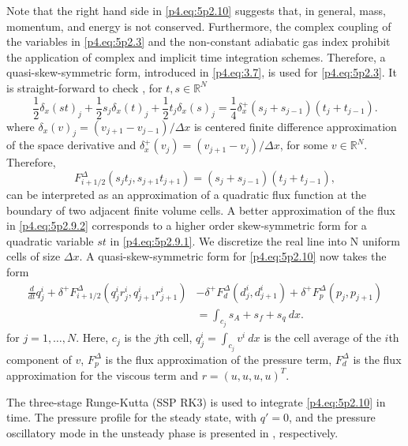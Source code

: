 Note that the right hand side in \eqref{p4.eq:5p2.10} suggests that, in general, mass, momentum, and energy is not conserved. Furthermore, the complex coupling of the variables in \eqref{p4.eq:5p2.3} and the non-constant adiabatic gas index prohibit the application of complex and implicit time integration schemes. Therefore, a quasi-skew-symmetric form, introduced in \eqref{p4.eq:3.7}, is used for \eqref{p4.eq:5p2.3}. It is straight-forward to check \cite{sjogreen2010skew}, for $t,s\in \mathbb R^{N}$
\begin{equation} \label{p4.eq:5p2.9.1}
	\frac 1 2 \delta_x (st)_j + \frac 1 2 s_j \delta_x (t)_j + \frac 1 2 t_j \delta_x (s)_j = \frac 1 4 \delta_x^+( s_j + s_{j-1} )(t_j + t_{j-1}).
\end{equation}
where $\delta_x (v)_j = \left( v_{j+1} - v_{j-1} \right)/\Delta x$ is centered finite difference approximation of the space derivative and $\delta_x^+ (v_j) = \left( v_{j+1} - v_j \right) /\Delta x$, for some $v\in \mathbb R^{N}$. Therefore,
\begin{equation} \label{p4.eq:5p2.9.2}
	F_{i+1/2}^{\Delta}(s_jt_j,s_{j+1}t_{j+1}) = ( s_j + s_{j-1} )(t_j + t_{j-1}),
\end{equation}
can be interpreted as an approximation of a quadratic flux function at the boundary of two adjacent finite volume cells. A better approximation of the flux in \eqref{p4.eq:5p2.9.2} corresponds to a higher order skew-symmetric form for a quadratic variable $st$ in \eqref{p4.eq:5p2.9.1}. We discretize the real line into N uniform cells of size $\Delta x$. A quasi-skew-symmetric form for \eqref{p4.eq:5p2.10} now takes the form
\begin{equation}
\begin{aligned}
	\frac{d}{dt} q^i_j + \delta^+ F^{\Delta}_{i+1/2}(q^i_jr^i_j,q^i_{j+1}r^i_{j+1}) &- \delta^+ F_d^{\Delta}(d^i_j,d^i_{j+1}) + \delta^+ F_p^{\Delta}(p_j,p_{j+1}) \\
	&= \int_{c_j} s_A + s_f + s_q \ dx.
\end{aligned}
\end{equation}
for $j=1,\dots,N$. Here, $c_j$ is the $j$th cell, $q^i_j = \int_{c_j} v^i \ dx$ is the cell average of the $i$th component of $v$, $F^{\Delta}_p$ is the flux approximation of the pressure term, $F^{\Delta}_d$ is the flux approximation for the viscous term and $r = ( u , u , u , u )^T$.

The three-stage Runge-Kutta (SSP RK3) \cite{jiang1996efficient} is used to integrate \eqref{p4.eq:5p2.10} in time. The pressure profile for the steady state, with $q'=0$, and the pressure oscillatory mode in the unsteady phase is presented in , respectively.

